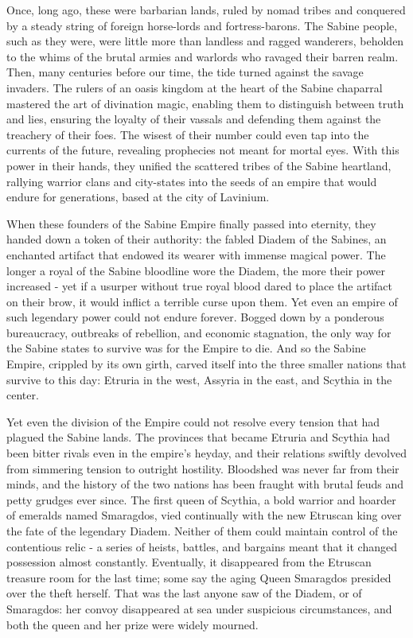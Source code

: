 \documentclass[blue]{Kos}
\begin{document}
\name{\bGeneralHistory{}}

Once, long ago, these were barbarian lands, ruled by nomad tribes and conquered by a steady string of foreign horse-lords and fortress-barons. The Sabine people, such as they were, were little more than landless and ragged wanderers, beholden to the whims of the brutal armies and warlords who ravaged their barren realm. Then, many centuries before our time, the tide turned against the savage invaders. The rulers of an oasis kingdom at the heart of the Sabine chaparral mastered the art of divination magic, enabling them to distinguish between truth and lies, ensuring the loyalty of their vassals and defending them against the treachery of their foes. The wisest of their number could even tap into the currents of the future, revealing prophecies not meant for mortal eyes. With this power in their hands, they unified the scattered tribes of the Sabine heartland, rallying warrior clans and city-states into the seeds of an empire that would endure for generations, based at the city of Lavinium. 

When these founders of the Sabine Empire finally passed into eternity, they handed down a token of their authority: the fabled Diadem of the Sabines, an enchanted artifact that endowed its wearer with immense magical power. The longer a royal of the Sabine bloodline wore the Diadem, the more their power increased - yet if a usurper without true royal blood dared to place the artifact on their brow, it would inflict a terrible curse upon them. Yet even an empire of such legendary power could not endure forever. Bogged down by a ponderous bureaucracy, outbreaks of rebellion, and economic stagnation, the only way for the Sabine states to survive was for the Empire to die. And so the Sabine Empire, crippled by its own girth, carved itself into the three smaller nations that survive to this day: Etruria in the west, Assyria in the east, and Scythia in the center.

Yet even the division of the Empire could not resolve every tension that had plagued the Sabine lands. The provinces that became Etruria and Scythia had been bitter rivals even in the empire's heyday, and their relations swiftly devolved from simmering tension to outright hostility. Bloodshed was never far from their minds, and the history of the two nations has been fraught with brutal feuds and petty grudges ever since. The first queen of Scythia, a bold warrior and hoarder of emeralds named Smaragdos, vied continually with the new Etruscan king over the fate of the legendary Diadem. Neither of them could maintain control of the contentious relic - a series of heists, battles, and bargains meant that it changed possession almost constantly. Eventually, it disappeared from the Etruscan treasure room for the last time; some say the aging Queen Smaragdos presided over the theft herself. That was the last anyone saw of the Diadem, or of Smaragdos: her convoy disappeared at sea under suspicious circumstances, and both the queen and her prize were widely mourned. 
\end{document}
